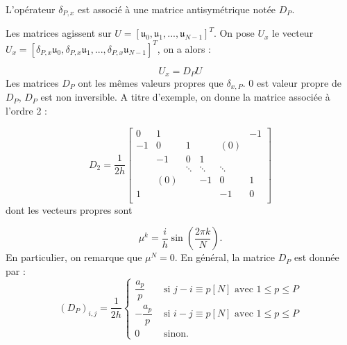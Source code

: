 L'opérateur $\delta_{P,x}$ est associé à une matrice antisymétrique notée $D_P$.

Les matrices agissent sur $U = [\mathfrak{u}_0, \mathfrak{u}_1, ..., \mathfrak{u}_{N-1}]^T$.
On pose $U_x$ le vecteur $U_x = [\delta_{P,x}\mathfrak{u}_0, \delta_{P,x}\mathfrak{u}_1, ..., \delta_{P,x}\mathfrak{u}_{N-1}]^T$, on a alors :

\begin{equation}
U_x = D_P U
\end{equation}
Les matrices $D_P$ ont les mêmes valeurs propres que $\delta_{x,P}$. $0$ est valeur propre de $D_P$, $D_P$ est non inversible. A titre d'exemple, on donne la matrice associée à l'ordre 2 :

\begin{equation}
D_2 = \dfrac{1}{2h} \begin{bmatrix}
0    & 1    &    &    &     & -1 \\
-1   & 0    & 1  &    & (0) &    \\
     & -1   & 0  & 1  &     &    \\
     &      & \ddots  & \ddots  & \ddots    &    \\
     & (0)  &    & -1 & 0   & 1  \\
1    &      &    &    & -1  & 0  \\
\end{bmatrix}
\end{equation}
dont les vecteurs propres sont 

\begin{equation}
\mu^k = \dfrac{i}{h} \sin \left( \dfrac{2 \pi k}{N} \right). 
\end{equation}
En particulier, on remarque que $\mu^N = 0$. En général, la matrice $D_P$ est donnée par :
\begin{equation}
\left( D_P \right)_{i,j} = \dfrac{1}{2h} \left\lbrace
\begin{array}{ll}
\dfrac{a_p}{p} & \text{ si } j - i \equiv p [N] \text{ avec } 1 \leq p \leq P \\
-\dfrac{a_p}{p} & \text{ si } i - j \equiv p [N] \text{ avec } 1 \leq p \leq P \\
0 & \text{ sinon.}
\end{array}
\right.
\label{eq:matrice_Dp}
\end{equation}











